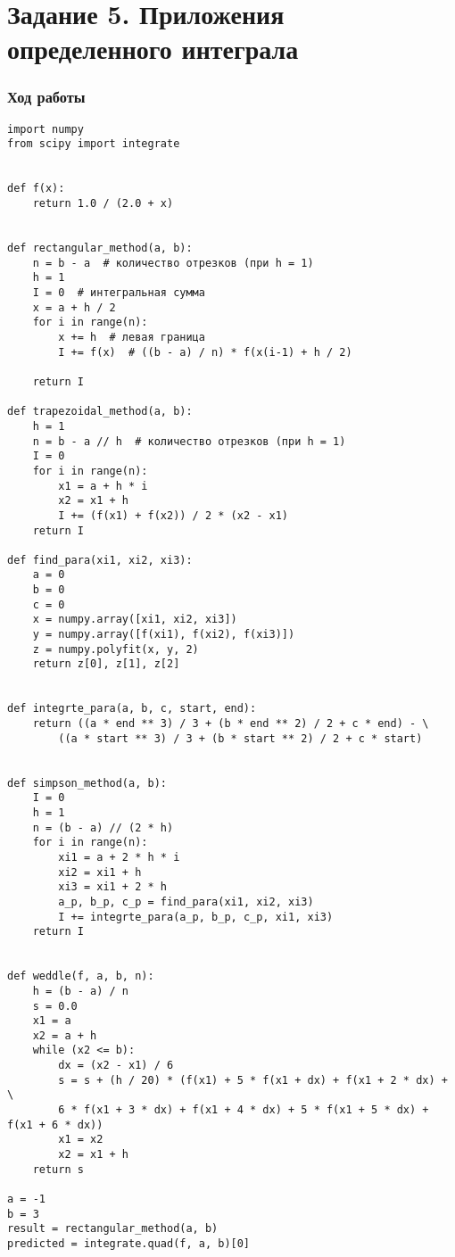 \documentclass{article}
\newenvironment{codelisting}{\captionsetup{type=listing}}{}
\begin{document}
\newpage

\section{Задание 5. Приложения определенного интеграла}

\subsubsection*{Ход работы}

\begin{codelisting}
\begin{verbatim}
import numpy
from scipy import integrate


def f(x):
    return 1.0 / (2.0 + x)


def rectangular_method(a, b):
    n = b - a  # количество отрезков (при h = 1)
    h = 1
    I = 0  # интегральная сумма
    x = a + h / 2
    for i in range(n):
        x += h  # левая граница
        I += f(x)  # ((b - a) / n) * f(x(i-1) + h / 2)

    return I

def trapezoidal_method(a, b):
    h = 1
    n = b - a // h  # количество отрезков (при h = 1)
    I = 0
    for i in range(n):
        x1 = a + h * i
        x2 = x1 + h
        I += (f(x1) + f(x2)) / 2 * (x2 - x1)
    return I

def find_para(xi1, xi2, xi3):
    a = 0
    b = 0
    c = 0
    x = numpy.array([xi1, xi2, xi3])
    y = numpy.array([f(xi1), f(xi2), f(xi3)])
    z = numpy.polyfit(x, y, 2)
    return z[0], z[1], z[2]


def integrte_para(a, b, c, start, end):
    return ((a * end ** 3) / 3 + (b * end ** 2) / 2 + c * end) - \
        ((a * start ** 3) / 3 + (b * start ** 2) / 2 + c * start)


def simpson_method(a, b):
    I = 0
    h = 1
    n = (b - a) // (2 * h)
    for i in range(n):
        xi1 = a + 2 * h * i
        xi2 = xi1 + h
        xi3 = xi1 + 2 * h
        a_p, b_p, c_p = find_para(xi1, xi2, xi3)
        I += integrte_para(a_p, b_p, c_p, xi1, xi3)
    return I


def weddle(f, a, b, n):
    h = (b - a) / n
    s = 0.0
    x1 = a
    x2 = a + h
    while (x2 <= b):
        dx = (x2 - x1) / 6
        s = s + (h / 20) * (f(x1) + 5 * f(x1 + dx) + f(x1 + 2 * dx) + \
        6 * f(x1 + 3 * dx) + f(x1 + 4 * dx) + 5 * f(x1 + 5 * dx) + f(x1 + 6 * dx))
        x1 = x2
        x2 = x1 + h
    return s

a = -1
b = 3
result = rectangular_method(a, b)
predicted = integrate.quad(f, a, b)[0]


\end{verbatim}
\end{codelisting}
\end{document}
